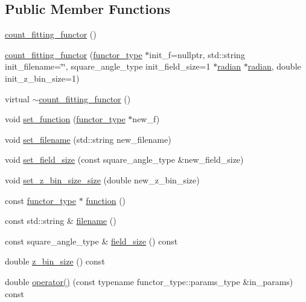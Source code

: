 \subsection*{Public Member Functions}
\begin{DoxyCompactItemize}
\item 
\hyperlink{classIceBRG_1_1count__fitting__functor_ab7dc64ad092fc074141479f3666a9aee}{count\-\_\-fitting\-\_\-functor} ()
\item 
\hyperlink{classIceBRG_1_1count__fitting__functor_ae65d78957fb615402de9e542fbfe53bc}{count\-\_\-fitting\-\_\-functor} (\hyperlink{classIceBRG_1_1count__fitting__functor_a681f2697a3ad0a5aa13882f0fba0e170}{functor\-\_\-type} $\ast$init\-\_\-f=nullptr, std\-::string init\-\_\-filename=\char`\"{}\char`\"{}, square\-\_\-angle\-\_\-type init\-\_\-field\-\_\-size=1 $\ast$\hyperlink{namespaceIceBRG_af78fec3f42ee23d596793328b8991468}{radian} $\ast$\hyperlink{namespaceIceBRG_af78fec3f42ee23d596793328b8991468}{radian}, double init\-\_\-z\-\_\-bin\-\_\-size=1)
\item 
virtual \hyperlink{classIceBRG_1_1count__fitting__functor_a6fb7fb4646ea0e7fca54a8663d2336be}{$\sim$count\-\_\-fitting\-\_\-functor} ()
\item 
void \hyperlink{classIceBRG_1_1count__fitting__functor_a4ddac394a07fc2c97dd9424088d93e8b}{set\-\_\-function} (\hyperlink{classIceBRG_1_1count__fitting__functor_a681f2697a3ad0a5aa13882f0fba0e170}{functor\-\_\-type} $\ast$new\-\_\-f)
\item 
void \hyperlink{classIceBRG_1_1count__fitting__functor_a306d2910021a49de54701d9b760716fb}{set\-\_\-filename} (std\-::string new\-\_\-filename)
\item 
void \hyperlink{classIceBRG_1_1count__fitting__functor_a9157659c3f62c4c8f174abbab2ef410c}{set\-\_\-field\-\_\-size} (const square\-\_\-angle\-\_\-type \&new\-\_\-field\-\_\-size)
\item 
void \hyperlink{classIceBRG_1_1count__fitting__functor_aa403b820e17878432d88505a47b17b38}{set\-\_\-z\-\_\-bin\-\_\-size\-\_\-size} (double new\-\_\-z\-\_\-bin\-\_\-size)
\item 
const \hyperlink{classIceBRG_1_1count__fitting__functor_a681f2697a3ad0a5aa13882f0fba0e170}{functor\-\_\-type} $\ast$ \hyperlink{classIceBRG_1_1count__fitting__functor_a2358d05da15333f122fed12e54d68e89}{function} ()
\item 
const std\-::string \& \hyperlink{classIceBRG_1_1count__fitting__functor_aef06cb7ea01e1fce2486a0748660525e}{filename} ()
\item 
const square\-\_\-angle\-\_\-type \& \hyperlink{classIceBRG_1_1count__fitting__functor_a844118d000e1ba187c616680279ab7b3}{field\-\_\-size} () const 
\item 
double \hyperlink{classIceBRG_1_1count__fitting__functor_a9e8a338d7df32350b3656ced348f7d28}{z\-\_\-bin\-\_\-size} () const 
\item 
double \hyperlink{classIceBRG_1_1count__fitting__functor_a1c394be90cfb3cb75dc57c52d386208d}{operator()} (const typename functor\-\_\-type\-::params\-\_\-type \&in\-\_\-params) const 
\end{DoxyCompactItemize}


